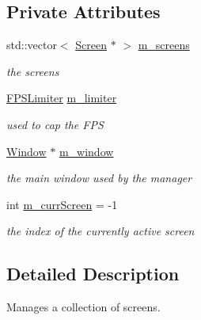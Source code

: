 \subsection*{Private Attributes}
\begin{DoxyCompactItemize}
\item 
\mbox{\label{classnta_1_1ScreenManager_aed16963ad12365acbaf0191e1a72243d}} 
std\+::vector$<$ \hyperlink{classnta_1_1Screen}{Screen} $\ast$ $>$ \hyperlink{classnta_1_1ScreenManager_aed16963ad12365acbaf0191e1a72243d}{m\+\_\+screens}
\begin{DoxyCompactList}\small\item\em the screens \end{DoxyCompactList}\item 
\mbox{\label{classnta_1_1ScreenManager_a6de9c180b4f4575a75659e2fc172b744}} 
\hyperlink{classnta_1_1FPSLimiter}{F\+P\+S\+Limiter} \hyperlink{classnta_1_1ScreenManager_a6de9c180b4f4575a75659e2fc172b744}{m\+\_\+limiter}
\begin{DoxyCompactList}\small\item\em used to cap the F\+PS \end{DoxyCompactList}\item 
\mbox{\label{classnta_1_1ScreenManager_a9df0128adeaa72737aab61513842de50}} 
\hyperlink{classnta_1_1Window}{Window} $\ast$ \hyperlink{classnta_1_1ScreenManager_a9df0128adeaa72737aab61513842de50}{m\+\_\+window}
\begin{DoxyCompactList}\small\item\em the main window used by the manager \end{DoxyCompactList}\item 
\mbox{\label{classnta_1_1ScreenManager_a65bc9c1f61548f548caf7e2e5da68693}} 
int \hyperlink{classnta_1_1ScreenManager_a65bc9c1f61548f548caf7e2e5da68693}{m\+\_\+curr\+Screen} = -\/1
\begin{DoxyCompactList}\small\item\em the index of the currently active screen \end{DoxyCompactList}\end{DoxyCompactItemize}


\subsection{Detailed Description}
Manages a collection of screens. 

